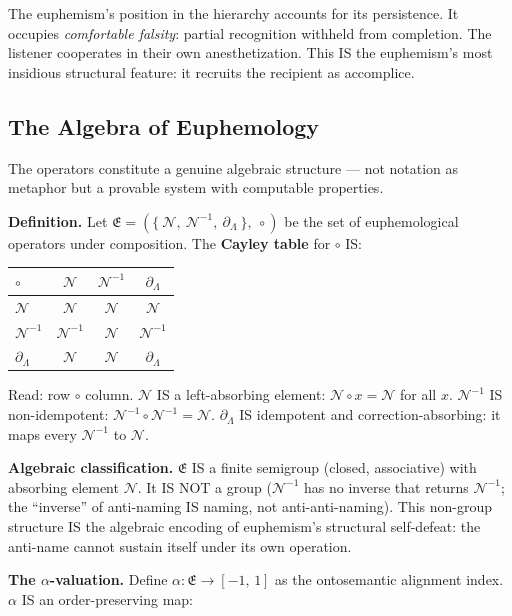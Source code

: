 \documentclass[11pt, oneside]{article}
\theoremstyle{definition}
\begin{document}
The euphemism's position in the hierarchy accounts for its persistence. It occupies \textit{comfortable falsity}: partial recognition withheld from completion. The listener cooperates in their own anesthetization. This IS the euphemism's most insidious structural feature: it recruits the recipient as accomplice.

\subsection{The Algebra of Euphemology}

The operators constitute a genuine algebraic structure --- not notation as metaphor but a provable system with computable properties.

\textbf{Definition.} Let $\mathfrak{E} = (\{\ \mathcal{N},\ \mathcal{N}^{-1},\ \partial_\Lambda\ \},\ \circ)$ be the set of euphemological operators under composition. The \textbf{Cayley table} for $\circ$ IS:

{\small
\noindent\begin{tabular}{@{} l | c c c @{}}
$\circ$ & $\mathcal{N}$ & $\mathcal{N}^{-1}$ & $\partial_\Lambda$ \\
\hline
$\mathcal{N}$ & $\mathcal{N}$ & $\mathcal{N}$ & $\mathcal{N}$ \\[0.15em]
$\mathcal{N}^{-1}$ & $\mathcal{N}^{-1}$ & $\mathcal{N}$ & $\mathcal{N}^{-1}$ \\[0.15em]
$\partial_\Lambda$ & $\mathcal{N}$ & $\mathcal{N}$ & $\partial_\Lambda$ \\[0.15em]
\end{tabular}
}

Read: row $\circ$ column. $\mathcal{N}$ IS a left-absorbing element: $\mathcal{N} \circ x = \mathcal{N}$ for all $x$. $\mathcal{N}^{-1}$ IS non-idempotent: $\mathcal{N}^{-1} \circ \mathcal{N}^{-1} = \mathcal{N}$. $\partial_\Lambda$ IS idempotent and correction-absorbing: it maps every $\mathcal{N}^{-1}$ to $\mathcal{N}$.

\textbf{Algebraic classification.} $\mathfrak{E}$ IS a finite semigroup (closed, associative) with absorbing element $\mathcal{N}$. It IS NOT a group ($\mathcal{N}^{-1}$ has no inverse that returns $\mathcal{N}^{-1}$; the ``inverse'' of anti-naming IS naming, not anti-anti-naming). This non-group structure IS the algebraic encoding of euphemism's structural self-defeat: the anti-name cannot sustain itself under its own operation.

\textbf{The $\alpha$-valuation.} Define $\alpha: \mathfrak{E} \to [-1,\, 1]$ as the ontosemantic alignment index. $\alpha$ IS an order-preserving map:
\end{document}
